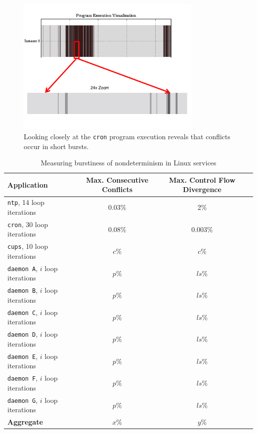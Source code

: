 \begin{figure}
  \center
  \includegraphics[trim=0cm 0cm 0cm 0cm, width=0.8\textwidth]{cronzoom-ch2.pdf}
  \caption[Understanding nature of conflicts in \texttt{cron}]%
  {Looking closely at the \texttt{cron} program execution reveals
    that conflicts occur in short bursts.}
  \label{cron:zoomtracech2}
\end{figure} 

\begin{table}
\caption{Measuring burstiness of nondeterminism in Linux services} 
\label{burst:stats}
\begin{center}
\begin{tabular}{||l|c|c|c||}\hline
  Application & Max. Consecutive Conflicts & Max. Control Flow Divergence \\
  \hline \hline
  \texttt{ntp}, 14 loop iterations & 0.03\% & 2\% 
  \\\hline
  \texttt{cron}, 30 loop iterations & 0.08\% & 0.003\% 
  \\\hline 
  \texttt{cups}, 10 loop iterations & $c$\% & $c$\% 
  \\\hline 
  \texttt{daemon A}, $i$ loop iterations & $p$\% & $ls$\% 
  \\\hline 
  \texttt{daemon B}, $i$ loop iterations & $p$\% & $ls$\% 
  \\\hline 
  \texttt{daemon C}, $i$ loop iterations & $p$\% & $ls$\% 
  \\\hline 
  \texttt{daemon D}, $i$ loop iterations & $p$\% & $ls$\% 
  \\\hline 
  \texttt{daemon E}, $i$ loop iterations & $p$\% & $ls$\% 
  \\\hline 
  \texttt{daemon F}, $i$ loop iterations & $p$\% & $ls$\% 
  \\\hline 
  \texttt{daemon G}, $i$ loop iterations & $p$\% & $ls$\% 
  \\\hline 
  \hline 
  {\bf Aggregate} & {\bf $x$}\% & {\bf $y$}\% %
  \\\hline 
\end{tabular}
\end{center}
\end{table}


